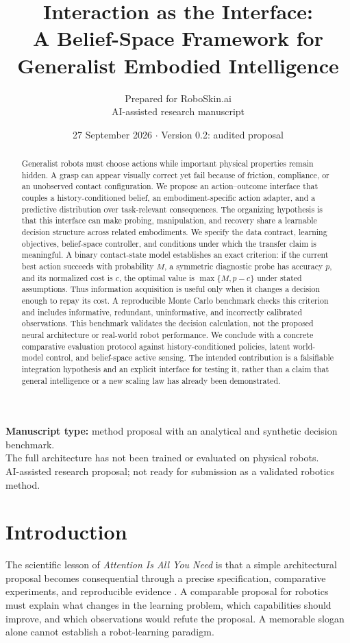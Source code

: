 \documentclass[11pt]{article}
\title{Interaction as the Interface:\\A Belief-Space Framework for\\Generalist Embodied Intelligence}
\author{Prepared for RoboSkin.ai\\\small AI-assisted research manuscript}
\date{27 September 2026 \quad $\cdot$ \quad Version 0.2: audited proposal}
\begin{document}
\maketitle
\begin{center}
\small\textbf{Manuscript type:} method proposal with an analytical and synthetic decision benchmark.\\
The full architecture has not been trained or evaluated on physical robots.\\
AI-assisted research proposal; not ready for submission as a validated robotics method.
\end{center}

\begin{abstract}
Generalist robots must choose actions while important physical properties remain hidden. A grasp can appear visually correct yet fail because of friction, compliance, or an unobserved contact configuration. We propose an action--outcome interface that couples a history-conditioned belief, an embodiment-specific action adapter, and a predictive distribution over task-relevant consequences. The organizing hypothesis is that this interface can make probing, manipulation, and recovery share a learnable decision structure across related embodiments. We specify the data contract, learning objectives, belief-space controller, and conditions under which the transfer claim is meaningful. A binary contact-state model establishes an exact criterion: if the current best action succeeds with probability $M$, a symmetric diagnostic probe has accuracy $p$, and its normalized cost is $c$, the optimal value is $\max\{M,p-c\}$ under stated assumptions. Thus information acquisition is useful only when it changes a decision enough to repay its cost. A reproducible Monte Carlo benchmark checks this criterion and includes informative, redundant, uninformative, and incorrectly calibrated observations. This benchmark validates the decision calculation, not the proposed neural architecture or real-world robot performance. We conclude with a concrete comparative evaluation protocol against history-conditioned policies, latent world-model control, and belief-space active sensing. The intended contribution is a falsifiable integration hypothesis and an explicit interface for testing it, rather than a claim that general intelligence or a new scaling law has already been demonstrated.
\end{abstract}

\section{Introduction}
The scientific lesson of \emph{Attention Is All You Need} is that a simple architectural proposal becomes consequential through a precise specification, comparative experiments, and reproducible evidence \cite{vaswani}. A comparable proposal for robotics must explain what changes in the learning problem, which capabilities should improve, and which observations would refute the proposal. A memorable slogan alone cannot establish a robot-learning paradigm.
\end{document}
